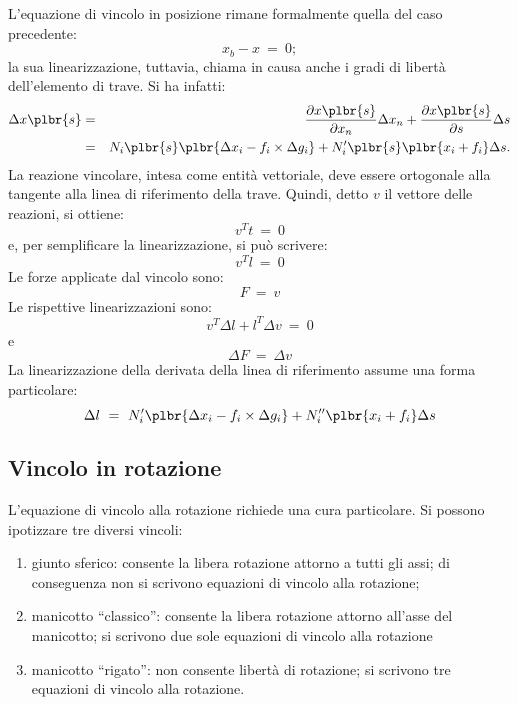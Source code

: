 \documentclass[12pt,dvips,fleqn,italian]{article}
\begin{document}
\noindent
L'equazione di vincolo in posizione rimane formalmente quella del caso
precedente:
\begin{displaymath}
    x_b - x \ = \ 0 ;
\end{displaymath}
la sua linearizzazione, tuttavia, chiama in causa anche i gradi di
libert\`{a} dell'elemento di trave.
Si ha infatti:
\begin{eqnarray*}
    \Delta{x\plbr{s}} & = &
    \frac{\partial{x\plbr{s}}}{\partial{x_n}} \Delta{x_n}
    + \frac{\partial{x\plbr{s}}}{\partial{s}} \Delta{s} \\
    & = &  
    N_i\plbr{s} \plbr{\Delta{x_i} - f_i\times\Delta{g_i}} 
    + N'_i\plbr{s} \plbr{x_i + f_i} \Delta{s} .
\end{eqnarray*}
La reazione vincolare, intesa come entit\`a vettoriale, deve essere 
ortogonale alla tangente alla linea di riferimento della trave.
Quindi, detto $ v $ il vettore delle reazioni, si ottiene:
\begin{displaymath}
    v^T t \ = \ 0
\end{displaymath}
e, per semplificare la linearizzazione, si pu\`o scrivere:
\begin{displaymath}
    v^T l \ = \ 0
\end{displaymath}
Le forze applicate dal vincolo sono:
\begin{displaymath}
    F \ = \ v
\end{displaymath}
Le rispettive linearizzazioni sono:
\begin{displaymath}
    v^T \Delta{l} + l^T \Delta{v} \ = \ 0
\end{displaymath}
e
\begin{displaymath}
    \Delta{F} \ = \ \Delta{v}
\end{displaymath}
La linearizzazione della derivata della linea di riferimento assume 
una forma particolare:
\begin{displaymath}
    \Delta{l} \ = \ N'_i\plbr{\Delta{x_i} - f_i\times\Delta{g_i}}
    + N''_i\plbr{x_i + f_i} \Delta{s}
\end{displaymath}



\subsection*{Vincolo in rotazione}
L'equazione di vincolo alla rotazione richiede una cura particolare.
Si possono ipotizzare tre diversi vincoli:
\begin{enumerate}
	\item giunto sferico: consente la libera rotazione attorno a tutti
	gli assi; di conseguenza non si scrivono equazioni di vincolo
	alla rotazione;
	\item manicotto ``classico'': consente la libera rotazione attorno
	all'asse del manicotto; si scrivono due sole equazioni di vincolo
	alla rotazione
	\item manicotto ``rigato'': non consente libert\`a di rotazione;
	si scrivono tre equazioni di vincolo alla rotazione.
\end{enumerate}
\end{document}
